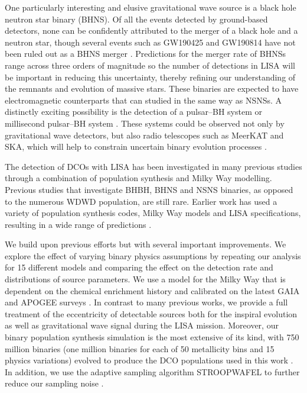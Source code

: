 One particularly interesting and elusive gravitational wave source is a black hole neutron star binary (BHNS). Of all the events detected by ground-based detectors, none can be confidently attributed to the merger of a black hole and a neutron star, though several events such as GW190425 and GW190814 have not been ruled out as a BHNS merger \citep{Abbott+2020_GW190425,Abbott+2020_GW190814}. Predictions for the merger rate of BHNSs range across three orders of magnitude \citep[e.g.][]{Abadie+2010, Broekgaarden+2021} so the number of detections in LISA will be important in reducing this uncertainty, thereby refining our understanding of the remnants and evolution of massive stars. These binaries are expected to have electromagnetic counterparts that can studied in the same way as NSNSs. A distinctly exciting possibility is the detection of a pulsar--BH system or millisecond pulsar--BH system \citep{Narayan+1991}. These systems could be observed not only by gravitational wave detectors, but also radio telescopes such as MeerKAT and SKA, which will help to constrain uncertain binary evolution processes \citep[e.g.][]{Pfahl+2005,Chattopadhyay+2020}.

The detection of DCOs with LISA has been investigated in many previous studies through a combination of population synthesis and Milky Way modelling. Previous studies that investigate BHBH, BHNS and NSNS binaries, as opposed to the numerous WDWD population, are still rare. Earlier work has used a variety of population synthesis codes, Milky Way models and LISA specifications, resulting in a wide range of predictions \citep{Nelemans+2001,Liu+2009,Belczynski+2010,Liu+2014,Lamberts+2019,Lau+2020,Breivik+2020,Sesana+2020}.

We build upon previous efforts but with several important improvements. We explore the effect of varying binary physics assumptions by repeating our analysis for 15 different models and comparing the effect on the detection rate and distributions of source parameters. We use a model for the Milky Way that is dependent on the chemical enrichment history and calibrated on the latest GAIA and APOGEE surveys \citep{Frankel+2018}. In contrast to many previous works, we provide a full treatment of the eccentricity of detectable sources both for the inspiral evolution as well as gravitational wave signal during the LISA mission. Moreover, our binary population synthesis simulation is the most extensive of its kind, with 750 million binaries (one million binaries for each of 50 metallicity bins and 15 physics variations) evolved to produce the DCO populations used in this work \citep{Broekgaarden+2021}. In addition, we use the adaptive sampling algorithm STROOPWAFEL to further reduce our sampling noise \citep{Broekgaarden+2019}.

